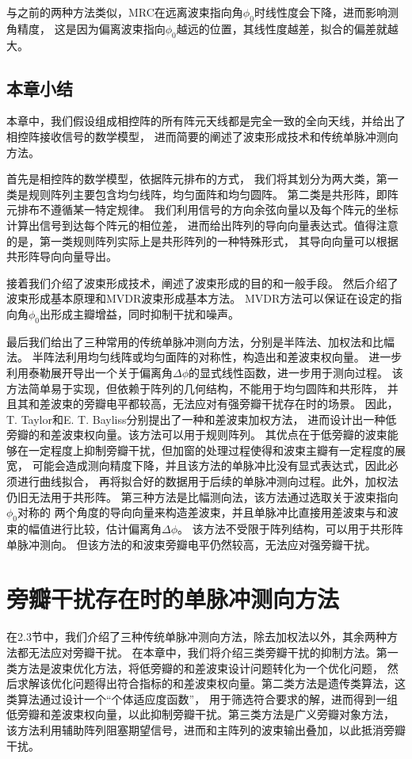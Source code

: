 \documentclass[master]{thesis-uestc}
\begin{document}
与之前的两种方法类似，MRC在远离波束指向角$\phi_0$时线性度会下降，进而影响测角精度，
这是因为偏离波束指向$\phi_0$越远的位置，其线性度越差，拟合的偏差就越大。

\section{本章小结}
本章中，我们假设组成相控阵的所有阵元天线都是完全一致的全向天线，并给出了相控阵接收信号的数学模型，
进而简要的阐述了波束形成技术和传统单脉冲测向方法。

首先是相控阵的数学模型，依据阵元排布的方式，
我们将其划分为两大类，第一类是规则阵列主要包含均匀线阵，均匀面阵和均匀圆阵。
第二类是共形阵，即阵元排布不遵循某一特定规律。
我们利用信号的方向余弦向量以及每个阵元的坐标计算出信号到达每个阵元的相位差，
进而给出阵列的导向向量表达式。值得注意的是，第一类规则阵列实际上是共形阵列的一种特殊形式，
其导向向量可以根据共形阵导向向量导出。

接着我们介绍了波束形成技术，阐述了波束形成的目的和一般手段。
然后介绍了波束形成基本原理和MVDR波束形成基本方法。
MVDR方法可以保证在设定的指向角$\phi_0$出形成主瓣增益，同时抑制干扰和噪声。

最后我们给出了三种常用的传统单脉冲测向方法，分别是半阵法、加权法和比幅法。
半阵法利用均匀线阵或均匀面阵的对称性，构造出和差波束权向量。
进一步利用泰勒展开导出一个关于偏离角$\Delta\phi$的显式线性函数，进一步用于测向过程。
该方法简单易于实现，但依赖于阵列的几何结构，不能用于均匀圆阵和共形阵，
并且其和差波束的旁瓣电平都较高，无法应对有强旁瓣干扰存在时的场景。
因此，T. Taylor和E. T. Bayliss分别提出了一种和差波束加权方法，
进而设计出一种低旁瓣的和差波束权向量。该方法可以用于规则阵列。
其优点在于低旁瓣的波束能够在一定程度上抑制旁瓣干扰，但加窗的处理过程使得和波束主瓣有一定程度的展宽，
可能会造成测向精度下降，并且该方法的单脉冲比没有显式表达式，因此必须进行曲线拟合，
再将拟合好的数据用于后续的单脉冲测向过程。此外，加权法仍旧无法用于共形阵。
第三种方法是比幅测向法，该方法通过选取关于波束指向$\phi_0$对称的
两个角度的导向向量来构造差波束，并且单脉冲比直接用差波束与和波束的幅值进行比较，估计偏离角$\Delta\phi$。
该方法不受限于阵列结构，可以用于共形阵单脉冲测向。
但该方法的和波束旁瓣电平仍然较高，无法应对强旁瓣干扰。

\chapter{旁瓣干扰存在时的单脉冲测向方法}
在2.3节中，我们介绍了三种传统单脉冲测向方法，除去加权法以外，其余两种方法都无法应对旁瓣干扰。
在本章中，我们将介绍三类旁瓣干扰的抑制方法。第一类方法是波束优化方法，将低旁瓣的和差波束设计问题转化为一个优化问题，
然后求解该优化问题得出符合指标的和差波束权向量。第二类方法是遗传类算法，这类算法通过设计一个“个体适应度函数”，
用于筛选符合要求的解，进而得到一组低旁瓣和差波束权向量，以此抑制旁瓣干扰。第三类方法是广义旁瓣对象方法，
该方法利用辅助阵列阻塞期望信号，进而和主阵列的波束输出叠加，以此抵消旁瓣干扰。
\end{document}

